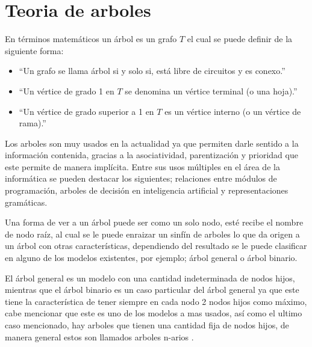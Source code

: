 \section{Teoria de arboles}
En términos matemáticos un árbol es un grafo $T$ el cual se puede definir de
 la siguiente forma\cite{SUSANNAS.EPP2012}:

\begin{itemize}
	\item ``Un grafo se llama árbol si y solo si, está libre de circuitos y
	 es conexo.''
	\item ``Un vértice de grado 1 en $T$ se denomina un vértice terminal (o
	 una hoja).''
	\item ``Un vértice de grado superior a 1 en $T$ es un vértice interno (o
	 un vértice de rama).''
\end{itemize}

Los arboles son muy usados en la actualidad ya que permiten  darle sentido a
 la información contenida, gracias a la asociatividad, parentización y
 prioridad que este permite de manera implícita. Entre sus usos múltiples en
 el área de la informática se pueden destacar los  siguientes; relaciones
 entre módulos de programación, arboles de decisión en inteligencia artificial
 y representaciones gramáticas\cite{gutierrez1999estructuras}.  

Una forma de ver a un árbol puede ser como un solo nodo, esté recibe el nombre
 de  nodo raíz, al cual se le puede enraizar un sinfín de arboles lo que da
 origen  a un árbol con otras características, dependiendo del resultado se le
 puede clasificar en alguno de los modelos existentes, por ejemplo; árbol 
 general o árbol binario\cite{gutierrez1999estructuras}. 

El árbol general es un modelo con una cantidad indeterminada de nodos hijos,
 mientras que el árbol binario es un caso particular del árbol general ya que
 este tiene la característica de tener siempre en cada nodo 2 nodos hijos como
 máximo, cabe mencionar que este es uno de los modelos a mas usados, así como
 el ultimo caso mencionado, hay arboles que tienen una cantidad fija de nodos
 hijos, de manera general estos son llamados arboles n-arios
 \cite{gutierrez1999estructuras}.